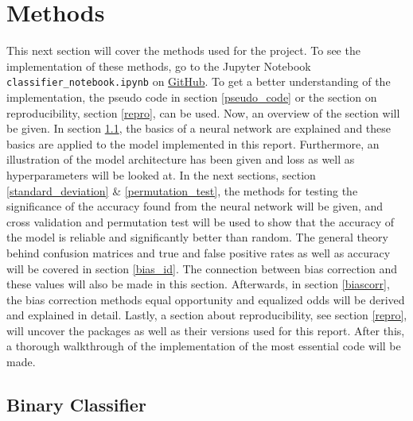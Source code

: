 \documentclass[11pt, fleqn, titlepage]{article}
\begin{document}
	\section{Methods} \label{methods}
	This next section will cover the methods used for the project. To see the implementation of these methods, go to the Jupyter Notebook \texttt{classifier\_notebook.ipynb} on \href{https://github.com/oskarwiese/fagprojekt/tree/master/src}{GitHub}. To get a better understanding of the implementation, the pseudo code in section \ref{pseudo_code} or the section on reproducibility, section \ref{repro}, can be used. Now, an overview of the section will be given. In section \ref{Feed-forward neural}, the basics of a neural network are explained and these basics are applied to the model implemented in this report. Furthermore, an illustration of the model architecture has been given and loss as well as hyperparameters will be looked at. In the next sections, section \ref{standard_deviation} \& \ref{permutation_test}, the methods for testing the significance of the accuracy found from the neural network will be given, and cross validation and permutation test will be used to show that the accuracy of the model is reliable and significantly better than random. The general theory behind confusion matrices and true and false positive rates as well as accuracy will be covered in section \ref{bias_id}. The connection between bias correction and these values will also be made in this section. Afterwards, in section \ref{biascorr}, the bias correction methods equal opportunity and equalized odds will be derived and explained in detail. Lastly, a section about reproducibility, see section \ref{repro}, will uncover the packages as well as their versions used for this report. After this, a thorough walkthrough of the implementation of the most essential code will be made.
	
	\subsection{Binary Classifier}\label{Feed-forward neural}
\end{document}
